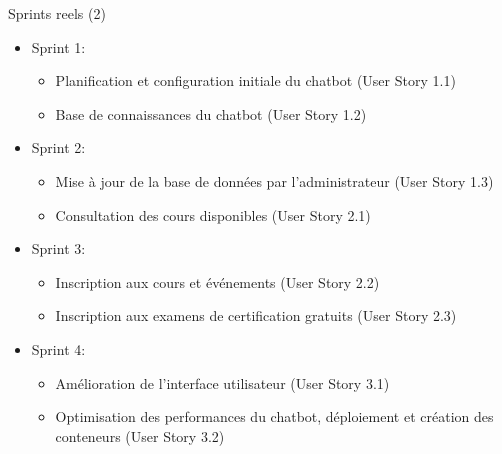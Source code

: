 \documentclass{beamer}
\begin{document}
   \begin{frame}{Sprints reels (2)}
 
    \begin{itemize}
        \item Sprint 1:
        \begin{itemize}
            \item Planification et configuration initiale du chatbot (User Story 1.1)
            \item Base de connaissances du chatbot (User Story 1.2)
        \end{itemize}
        
        \item Sprint 2:
        \begin{itemize}
            \item Mise à jour de la base de données par l’administrateur (User Story 1.3)
            \item Consultation des cours disponibles (User Story 2.1)
        \end{itemize}
        
        \item Sprint 3:
        \begin{itemize}
            \item Inscription aux cours et événements (User Story 2.2)
            \item Inscription aux examens de certification gratuits (User Story 2.3)
        \end{itemize}
        
        \item Sprint 4:
        \begin{itemize}
            \item Amélioration de l’interface utilisateur (User Story 3.1)
            \item Optimisation des performances du chatbot, déploiement et création des conteneurs (User Story 3.2)
        \end{itemize}
    \end{itemize}
    
   \end{frame}
\end{document}
